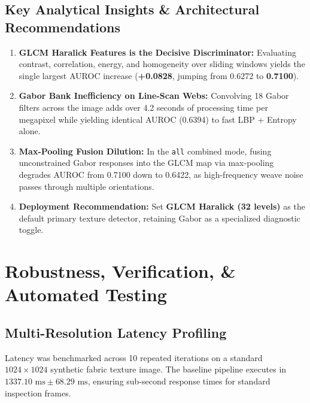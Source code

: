 \documentclass[10pt,a4paper]{article}
\begin{document}
\subsection{Key Analytical Insights \& Architectural Recommendations}
\begin{enumerate}[leftmargin=1.5em,itemsep=3pt]
    \item \textbf{GLCM Haralick Features is the Decisive Discriminator:} Evaluating contrast, correlation, energy, and homogeneity over sliding windows yields the single largest AUROC increase (\textbf{+0.0828}, jumping from 0.6272 to \textbf{0.7100}).
    \item \textbf{Gabor Bank Inefficiency on Line-Scan Webs:} Convolving 18 Gabor filters across the image adds over 4.2 seconds of processing time per megapixel while yielding identical AUROC (0.6394) to fast LBP + Entropy alone.
    \item \textbf{Max-Pooling Fusion Dilution:} In the \texttt{all} combined mode, fusing unconstrained Gabor responses into the GLCM map via max-pooling degrades AUROC from 0.7100 down to 0.6422, as high-frequency weave noise passes through multiple orientations.
    \item \textbf{Deployment Recommendation:} Set \textbf{GLCM Haralick (32 levels)} as the default primary texture detector, retaining Gabor as a specialized diagnostic toggle.
\end{enumerate}

\section{Robustness, Verification, \& Automated Testing}

\subsection{Multi-Resolution Latency Profiling}
Latency was benchmarked across 10 repeated iterations on a standard $1024 \times 1024$ synthetic fabric texture image. The baseline pipeline executes in $1337.10\text{ ms} \pm 68.29\text{ ms}$, ensuring sub-second response times for standard inspection frames.
\end{document}

